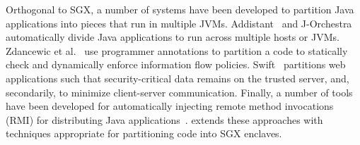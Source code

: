 Orthogonal to SGX, a number of systems have been developed to 
partition Java applications into pieces that run in multiple JVMs.
Addistant~\citep{addistant} and J-Orchestra~\citep{jorchestra}
automatically divide Java applications to run across multiple hosts or JVMs.
Zdancewic et al.~\citep{jif-split} use programmer annotations
to partition a code to statically check and dynamically enforce 
information flow policies.
Swift~\citep{swift} partitions web applications such that
security-critical data remains on the trusted server,
and, secondarily, to minimize client-server communication.
Finally, a number of tools have been developed for automatically injecting remote method invocations (RMI)
for distributing Java applications~\citep{philippsen1997javaparty, czajkowski2002code, spiegel1999pangaea, tilevich2008nrmi, aridor1999cjvm, diaconescu2005compiler}.
\systemname{} extends these approaches with techniques appropriate
for partitioning code into SGX enclaves.


